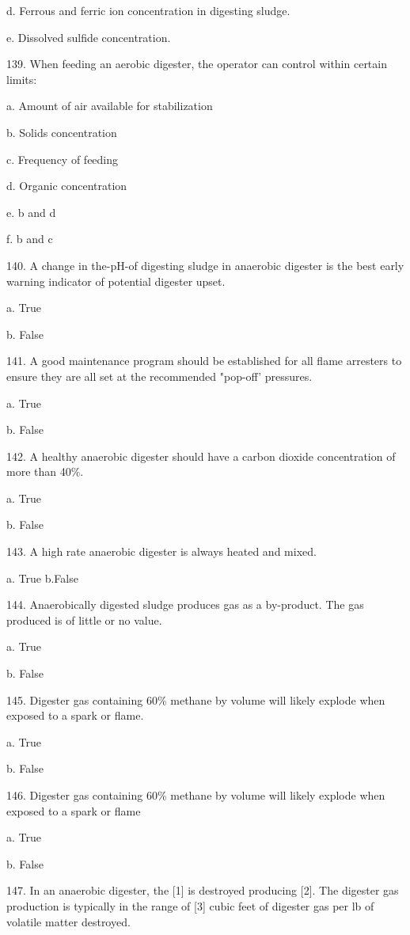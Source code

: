 \documentclass{article}
\begin{document}
d. Ferrous and ferric ion concentration in digesting sludge. 

e. Dissolved sulfide concentration. 


139. When feeding an aerobic digester, the operator can control within certain limits: 

a. Amount of air available for stabilization 

b. Solids concentration 

c. Frequency of feeding 

d. Organic concentration 

e. b and d 

f. b and c 


140. A change in the-pH-of digesting sludge in anaerobic digester is the best early warning indicator of potential digester upset. 

a. True 

b. False 


141. A good maintenance program should be established for all flame arresters to ensure they are all set at the recommended "pop-off' pressures. 

a. True 

b. False 


142. A healthy anaerobic digester should have a carbon dioxide concentration of more than 40\%. 

a. True 

b. False 


143. A high rate anaerobic digester is always heated and mixed. 

a. True
b.False 


144. Anaerobically digested sludge produces gas as a by-product. The gas produced is of little or no value. 

a. True 

b. False 


145. Digester gas containing 60\% methane by volume will likely explode when exposed to a spark or flame. 

a. True 

b. False 


146. Digester gas containing 60\% methane by volume will likely explode when exposed to a spark or flame 

a. True 

b. False 


147. In an anaerobic digester, the [1] is destroyed producing [2]. The digester gas production is typically in the range of [3] cubic feet of digester gas per lb of volatile matter destroyed. 
\end{document}

